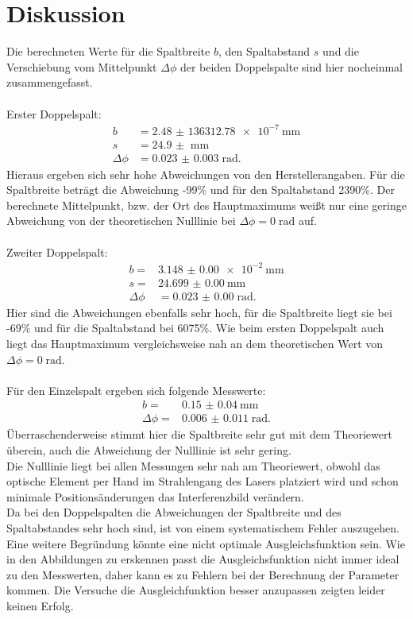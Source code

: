 \section{Diskussion}
\label{sec:Diskussion}
Die berechneten Werte für die Spaltbreite $b$, den Spaltabstand $s$ und die
Verschiebung vom Mittelpunkt $\Delta \phi$ der beiden
Doppelspalte sind hier nocheinmal zusammengefasst.\\
\\
Erster Doppelspalt:
\begin{align*}
  b &=\SI{2.48(13631278)e-7}{\mm}\\
  s &=\SI{24.9(0)}{\mm}\\
  \Delta \phi &=\SI{0.023(3)}\; \text{rad}.
\end{align*}
Hieraus ergeben sich sehr hohe Abweichungen von den Herstellerangaben. Für die
Spaltbreite beträgt die Abweichung -99\% und für den Spaltabstand 2390\%.
Der berechnete Mittelpunkt, bzw. der Ort des Hauptmaximums weißt nur eine
geringe Abweichung von der theoretischen Nulllinie bei $\Delta \phi = 0\; \text{rad}$ auf.\\
\\

Zweiter Doppelspalt:
\begin{align*}
  b =&\SI{3.148(0)e-2}{\mm}\\
  s =&\SI{24.699(0)}{\mm}\\
  \Delta \phi &=\SI{0.023(0)}\; \text{rad}.
\end{align*}
Hier sind die Abweichungen ebenfalls sehr hoch, für die Spaltbreite liegt sie bei
-69\% und für die Spaltabstand bei 6075\%. Wie beim ersten Doppelspalt auch
liegt das Hauptmaximum vergleichsweise nah an dem theoretischen Wert von
$ \Delta \phi= 0\;\text{rad}$.\\
\\
Für den Einzelspalt ergeben sich folgende Messwerte:
\begin{align*}
  b =&\SI{0.15(4)}{\mm}\\
  \Delta \phi=& \SI{0.006(11)}\; \text{rad}.
\end{align*}
Überraschenderweise stimmt hier die Spaltbreite sehr gut mit dem Theoriewert überein, auch
die Abweichung der Nulllinie ist sehr gering.
\\
Die Nulllinie liegt bei allen Messungen sehr nah am Theoriewert, obwohl das
optische Element per Hand im Strahlengang des Lasers platziert wird und schon minimale
Positionsänderungen das Interferenzbild verändern.\\
Da bei den Doppelspalten die Abweichungen der Spaltbreite und des Spaltabstandes
sehr hoch sind, ist von einem systematischem Fehler auszugehen. Eine weitere
Begründung könnte eine nicht optimale Ausgleichsfunktion sein. Wie in den Abbildungen
zu erskennen passt die Ausgleichsfunktion nicht immer ideal zu den Messwerten, daher
kann es zu Fehlern bei der Berechnung der Parameter kommen. Die Versuche die Ausgleichfunktion
besser anzupassen zeigten leider keinen Erfolg.
